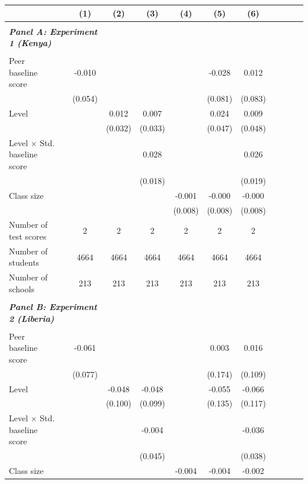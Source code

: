 \begin{center} 
\caption{\small Effect on test scores} 
\label{tab:descriptives} 
\begin{scriptsize}
\begin{threeparttable}
\begin{tabular} {@{} l l c c c c c c c c c c  @{}} \toprule \toprule
& &(1)&(2)&(3)&(4)&(5)&(6) \\ \midrule 
\\
\multicolumn{3}{l}{\textbf{\textit{Panel A: Experiment 1 (Kenya)}}} \\
\\
Peer baseline score &  & -0.010 &  &  &  & -0.028 & 0.012 \\
                 &  & (0.054) &  &  &  & (0.081) & (0.083) \\
Level &  &  & 0.012 & 0.007 &  & 0.024 & 0.009 \\
                 &  &  & (0.032) & (0.033) &  & (0.047) & (0.048) \\
Level $\times$ Std. baseline score &  &  &  & 0.028 &  &  & 0.026 \\
                 &  &  &  & (0.018) &  &  & (0.019) \\
Class size &  &  &  &  & -0.001 & -0.000 & -0.000 \\
                 &  &  &  &  & (0.008) & (0.008) & (0.008) \\
\midrule
Number of test scores &  & 2 & 2 & 2 & 2 & 2 & 2 \\
Number of students &  & 4664 & 4664 & 4664 & 4664 & 4664 & 4664 \\
Number of schools &  & 213 & 213 & 213 & 213 & 213 & 213 \\
 \midrule
\\
\multicolumn{3}{l}{\textbf{\textit{Panel B: Experiment 2 (Liberia)}}} \\
\\
Peer baseline score &  & -0.061 &  &  &  & 0.003 & 0.016 \\
                 &  & (0.077) &  &  &  & (0.174) & (0.109) \\
Level &  &  & -0.048 & -0.048 &  & -0.055 & -0.066 \\
                 &  &  & (0.100) & (0.099) &  & (0.135) & (0.117) \\
Level $\times$ Std. baseline score &  &  &  & -0.004 &  &  & -0.036 \\
                 &  &  &  & (0.045) &  &  & (0.038) \\
Class size &  &  &  &  & -0.004 & -0.004 & -0.002 \\

\end{tabular}
\end{threeparttable}
\end{scriptsize}
\end{center}
